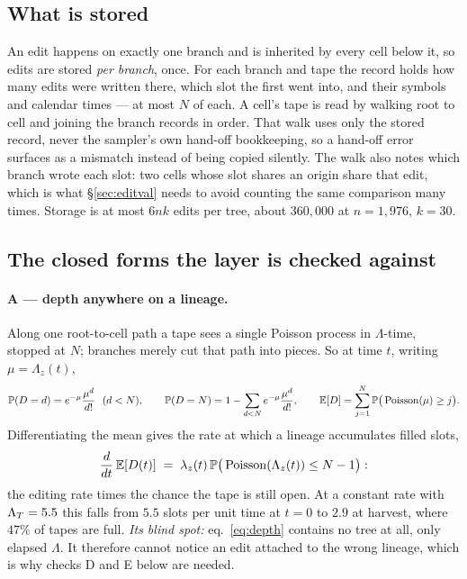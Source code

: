 \subsection{What is stored}\label{sec:storage}

An edit happens on exactly one branch and is inherited by every cell below it, so edits are stored
\emph{per branch}, once. For each branch and tape the record holds how many edits were written there,
which slot the first went into, and their symbols and calendar times --- at most $N$ of each. A cell's
tape is read by walking root to cell and joining the branch records in order. That walk uses only the
stored record, never the sampler's own hand-off bookkeeping, so a hand-off error surfaces as a mismatch
instead of being copied silently. The walk also notes which branch wrote each slot: two cells whose slot
shares an origin share that edit, which is what \S\ref{sec:editval} needs to avoid counting the same
comparison many times. Storage is at most $6nk$ edits per tree, about $360{,}000$ at $n=1{,}976$,
$k=30$.

\subsection{The closed forms the layer is checked against}\label{sec:editcf}

\paragraph{A --- depth anywhere on a lineage.} Along one root-to-cell path a tape sees a single Poisson
process in $\Lambda$-time, stopped at $N$; branches merely cut that path into pieces. So at time $t$,
writing $\mu=\Lambda_z(t)$,
\begin{equation}
  \Prob(D=d)=e^{-\mu}\frac{\mu^{d}}{d!}\ \ (d<N),\qquad
  \Prob(D=N)=1-\sum_{d<N}e^{-\mu}\frac{\mu^{d}}{d!},\qquad
  \E[D]=\sum_{j=1}^{N}\Prob\big(\Poisson(\mu)\ge j\big).
  \label{eq:depth}
\end{equation}
Differentiating the mean gives the rate at which a lineage accumulates filled slots,
\begin{equation}
  \frac{d}{dt}\,\mathbb{E}[D(t)] \;=\; \lambda_z(t)\,\mathbb{P}\big(\operatorname{Poisson}(\Lambda_z(t))\le N-1\big):
  \label{eq:depthslope}
\end{equation}
the editing rate times the chance the tape is still open. At a constant rate with $\Lambda_T=5.5$ this
falls from $5.5$ slots per unit time at $t=0$ to $2.9$ at harvest, where $47\%$ of tapes are full.
\emph{Its blind spot:} eq.~\eqref{eq:depth} contains no tree at all, only elapsed $\Lambda$. It
therefore cannot notice an edit attached to the wrong lineage, which is why checks D and E below are
needed.

